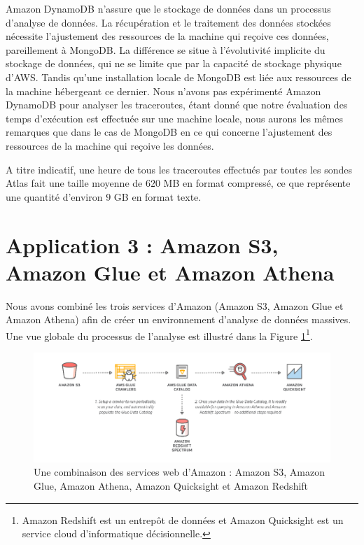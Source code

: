  Amazon DynamoDB  n'assure que le stockage de données dans un processus d'analyse de données. La récupération et le traitement  des données stockées nécessite l'ajustement des ressources de la machine qui reçoive ces données, pareillement à MongoDB. La différence se situe à l'évolutivité implicite du stockage de données, qui ne se limite que par la capacité de stockage physique d'AWS. Tandis qu'une installation locale de MongoDB est liée aux ressources de la machine hébergeant ce dernier.  Nous n'avons pas expérimenté Amazon DynamoDB pour analyser les traceroutes, étant donné que notre évaluation des temps d'exécution est effectuée sur une machine locale, nous aurons les mêmes remarques que dans le cas de MongoDB en ce qui concerne l'ajustement des ressources de la machine qui reçoive les données.  
 
 A titre indicatif, une heure de tous les traceroutes effectués par toutes les sondes Atlas fait une taille moyenne de  $620$ MB en format compressé, ce que représente une quantité d'environ $9$ GB en format texte.






\section{Application 3 : Amazon S3, Amazon Glue  et Amazon Athena }



Nous avons combiné les trois services d'Amazon (Amazon S3, Amazon Glue  et Amazon Athena)  afin de créer un environnement d'analyse de données massives. Une vue globale du  processus de l'analyse  est illustré dans la Figure \ref{fig:gluecrawler}\footnote{Amazon Redshift  est un entrepôt de données et  Amazon Quicksight  est un service cloud d'informatique décisionnelle.}. 

\begin{figure}[H]
	\centering
	\captionsetup{justification=centering}
	\includegraphics[width=1\linewidth]{illustrations/glue_crawler}
	\caption{Une combinaison des services web d'Amazon : Amazon S3, Amazon Glue, Amazon Athena, Amazon Quicksight  et Amazon Redshift}
	\label{fig:gluecrawler}
\end{figure}


